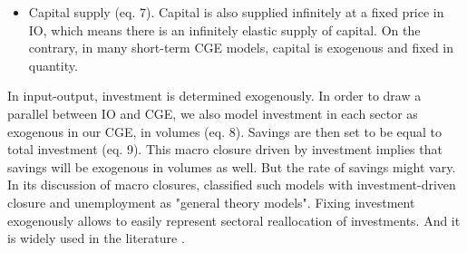 \begin{itemize}
	\item Capital supply (eq. 7). Capital is also supplied infinitely at a fixed price in IO, which means there is an infinitely elastic supply of capital. On the contrary, in many short-term CGE models, capital is exogenous and fixed in quantity.
\end{itemize}

In input-output, investment is determined exogenously. In order to draw a parallel between IO and CGE, we also model investment in each sector as exogenous in our CGE, in volumes (eq. 8). Savings are then set to be equal to total investment (eq. 9). 
This macro closure driven by investment implies that savings will be exogenous in volumes as well. But the rate of savings might vary. 
In its discussion of macro closures, \citet[p. 57]{Sen1963} classified such models with investment-driven closure and unemployment as "general theory models".
Fixing investment exogenously allows to easily represent sectoral reallocation of investments. And it is widely used in the literature \citep{Lehr2008,Lehr2012}.


